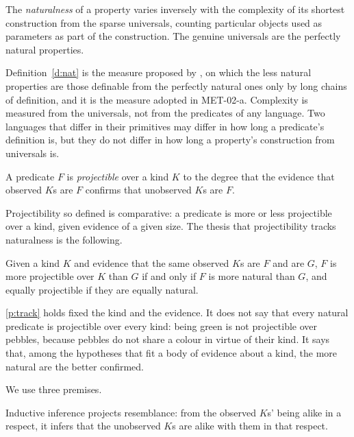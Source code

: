 \documentclass{situationist-preprint}
\begin{document}
\begin{definition}\label{d:nat}
The \emph{naturalness} of a property varies inversely with the complexity of its shortest construction from the sparse universals, counting particular objects used as parameters as part of the construction. The genuine universals are the perfectly natural properties.
\end{definition}

Definition~\ref{d:nat} is the measure proposed by \citet[p.~61]{Lewis1986}, on which the less natural properties are those definable from the perfectly natural ones only by long chains of definition, and it is the measure adopted in MET-02-a. Complexity is measured from the universals, not from the predicates of any language. Two languages that differ in their primitives may differ in how long a predicate's definition is, but they do not differ in how long a property's construction from universals is.

\begin{definition}[Projectibility]\label{d:proj}
A predicate $F$ is \emph{projectible} over a kind $K$ to the degree that the evidence that observed $K$s are $F$ confirms that unobserved $K$s are $F$.
\end{definition}

Projectibility so defined is comparative: a predicate is more or less projectible over a kind, given evidence of a given size. The thesis that projectibility tracks naturalness is the following.

\begin{principle}[Tracking]\label{p:track}
Given a kind $K$ and evidence that the same observed $K$s are $F$ and are $G$, $F$ is more projectible over $K$ than $G$ if and only if $F$ is more natural than $G$, and equally projectible if they are equally natural.
\end{principle}

\ref{p:track} holds fixed the kind and the evidence. It does not say that every natural predicate is projectible over every kind: being green is not projectible over pebbles, because pebbles do not share a colour in virtue of their kind. It says that, among the hypotheses that fit a body of evidence about a kind, the more natural are the better confirmed.

We use three premises.

\begin{principle}[Resemblance]\label{p:resemblance}
Inductive inference projects resemblance: from the observed $K$s' being alike in a respect, it infers that the unobserved $K$s are alike with them in that respect.
\end{principle}
\end{document}
